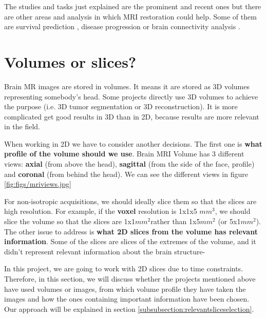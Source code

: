 The studies and tasks just explained are the prominent and recent ones but there are other areas and analysis in which MRI restoration could help. Some of them are survival prediction \cite{AnexoReviewAditional}, disease progression \cite{AnexoProgression} or brain connectivity analysis   \cite{AnexoConnectivity}.

\section{Volumes or slices?}
\label{section:soa_vols_slices}

Brain MR images are stored in volumes. It means it are stored as 3D volumes representing somebody's head. Some projects directly use 3D volumes to achieve the purpose (i.e. 3D tumor segmentation or 3D reconstruction). It is more complicated get good results in 3D than in 2D, because results are more relevant in the field. 

When working in 2D we have to consider another decisions. The first one is \textbf{what profile of the volume should we use}. Brain MRI Volume has 3 different views: \textbf{axial} (from above the head), \textbf{sagittal} (from the side of the face, profile) and \textbf{coronal} (from behind the head). We can see the different views in figure \ref{fig:figs/mriviews.jpg}


For non-isotropic acquisitions, we should ideally slice them so that the slices are high resolution. For example, if the \textbf{voxel} resolution is 1x1x5 $mm^3$, we should slice the volume so that the slices are 1x1$mm^2$rather than 1x5$mm^2$ (or 5x1$mm^2$). The other issue to address is \textbf{what 2D slices from the volume has relevant information}. Some of the slices are slices of the extremes of the volume, and it didn't represent relevant information about the brain structure-

In this project, we are going to work with 2D slices due to time constraints. Therefore, in this section, we will discuss whether the projects mentioned above have used volumes or images, from which volume profile they have taken the images and how the ones containing important information have been chosen. Our approach will be explained in section \ref{subsubsection:relevantsliceselection}.

